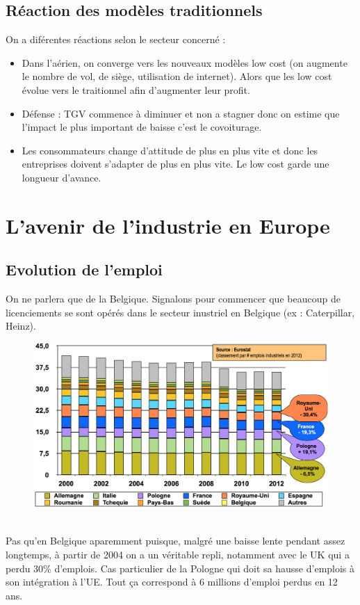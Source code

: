 \subsection{Réaction des modèles traditionnels}
On a diférentes réactions selon le secteur concerné :
\begin{itemize}
	\item Dans l'aérien, on converge vers les nouveaux modèles low cost (on augmente le nombre de vol, de siège, utilisation de internet). Alors que les low cost évolue vers le traitionnel afin d'augmenter leur profit.

	\item Défense : TGV commence à diminuer et non a stagner donc on estime que l’impact le plus important de  baisse c’est le covoiturage. 

	\item Les consommateurs change d’attitude de plus en plus vite et donc les entreprises doivent s’adapter de plus en plus vite. Le low cost garde une longueur d'avance. 
\end{itemize}
\newpage

\section{L'avenir de l'industrie en Europe}
\subsection{Evolution de l'emploi}
On ne parlera que de la Belgique. Signalons pour commencer que beaucoup de licenciements se sont opérés dans le secteur inustriel en Belgique (ex : Caterpillar, Heinz). 
\begin{figure}
\includegraphics[scale=0.3]{66}
\end{figure}
\ \\
Pas qu'en Belgique aparemment puisque, malgré une baisse lente pendant assez longtemps, à partir de 2004 on a un véritable repli, notamment avec le UK qui a perdu 30\% d'emplois. Cas particulier de la Pologne qui doit sa hausse d'emplois à son intégration à l’UE. Tout ça correspond à 6 millions d'emploi perdus en 12 ans. 

